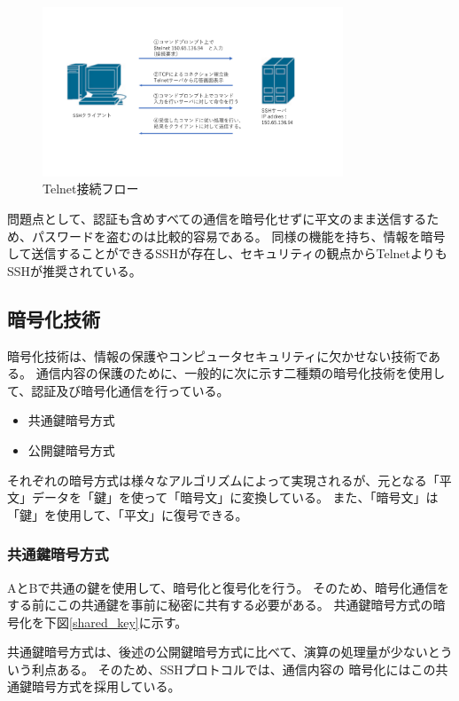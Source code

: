 \documentclass[12pt,a4paper,titlepage]{jsarticle}
\begin{document}
\begin{figure}[H]
    \centering
    \includegraphics*[width=0.8\textwidth,page=1]{graphs/network_archtecture.pdf}
    \caption{Telnet接続フロー}
    \label{telnet_flow}
\end{figure}

問題点として、認証も含めすべての通信を暗号化せずに平文のまま送信するため、パスワードを盗むのは比較的容易である。
同様の機能を持ち、情報を暗号して送信することができるSSHが存在し、セキュリティの観点からTelnetよりもSSHが推奨されている。

\subsection{暗号化技術}
暗号化技術は、情報の保護やコンピュータセキュリティに欠かせない技術である。
通信内容の保護のために、一般的に次に示す二種類の暗号化技術を使用して、認証及び暗号化通信を行っている。
\begin{itemize}
    \item 共通鍵暗号方式
    \item 公開鍵暗号方式
\end{itemize}
それぞれの暗号方式は様々なアルゴリズムによって実現されるが、元となる「平文」データを「鍵」を使って「暗号文」に変換している。
また、「暗号文」は「鍵」を使用して、「平文」に復号できる。

\subsubsection{共通鍵暗号方式}
AとBで共通の鍵を使用して、暗号化と復号化を行う。
そのため、暗号化通信をする前にこの共通鍵を事前に秘密に共有する必要がある。
共通鍵暗号方式の暗号化を下図\ref{shared_key}に示す。

共通鍵暗号方式は、後述の公開鍵暗号方式に比べて、演算の処理量が少ないとういう利点ある。
そのため、SSHプロトコルでは、通信内容の
暗号化にはこの共通鍵暗号方式を採用している。
\end{document}
